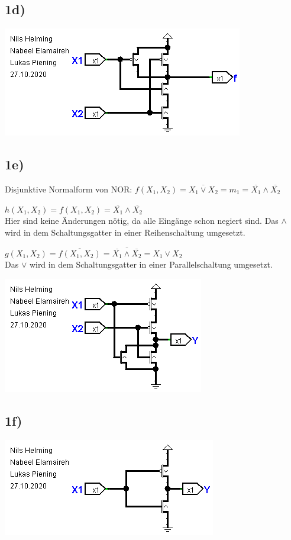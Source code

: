\documentclass[]{article}
\newcommand{\V}{\lor}
\newcommand{\A}{\land}
\newcommand{\T}[1]{\overline{#1}}
\begin{document}
\subsection*{1d)}
	\begin{center}\includegraphics[scale=0.7]{Bilder/1_d.png}\end{center}
\subsection*{1e)}
	Disjunktive Normalform von NOR:
	$f(X_1, X_2) = \T{X_1 \V X_2} = m_1 = \T{X_1} \A \T{X_2}$


	$h(X_1, X_2) = f(X_1, X_2) = \T{X_1} \A \T{X_2}$\\ Hier sind keine Änderungen nötig, da alle Eingänge schon negiert sind. Das $\A$ wird in dem Schaltungsgatter in einer Reihenschaltung umgesetzt.


	$g(X_1, X_2) = \T{f(X_1, X_2)} = \T{\T{X_1} \A \T{X_2}} = X_1 \V X_2$\\
	Das $\V$ wird in dem Schaltungsgatter in einer Parallelschaltung umgesetzt.
	\begin{center}\includegraphics[scale=0.7]{Bilder/1_e.png}\end{center}
\subsection*{1f)}
	\begin{center}\includegraphics[scale=0.7]{Bilder/1_f.png}\end{center}
\end{document}
